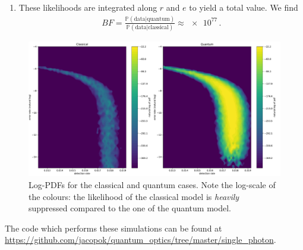 \documentclass[main.tex]{subfiles}
\begin{document}
\begin{enumerate}
    For each of the \(N _{\text{sim}}\) simulations the values \(N_{TG}\), \(N_{RG}\) and \(N_{TRG}\) are extracted (also, trivially, the fixed value of \(N_G\)). 
    From these, a gaussian Kernel-Density Estimation technique (using Scott's rule \cite[]{scipycontributorsScipyStatsGaussian2019,scottMultivariateDensityEstimation2015}) is used to estimate the value of the multivariate PDF at the point corresponding to the measured data for both models: the likelihood of the data.
    The variation of these likelihoods is shown in figure \ref{fig:both_logpdfs}. 
    \item These likelihoods are integrated along \(r\) and \(e\) to yield a total value. We find 
    \begin{align}
    BF = \frac{\mathbb{P}(\text{data} | \text{quantum})}{\mathbb{P}(\text{data} | \text{classical})}
    \approx \num{e77}
    \,.
    \end{align}
\end{enumerate}

\begin{figure}[ht]
\centering
\includegraphics[width=\textwidth]{figures/both_logpdfs}
\caption{Log-PDFs for the classical and quantum cases. Note the log-scale of the colours: the likelihood of the classical model is \emph{heavily} suppressed compared to the one of the quantum model.}
\label{fig:both_logpdfs}
\end{figure}

The code which performs these simulations can be found at \url{https://github.com/jacopok/quantum_optics/tree/master/single_photon}. 
\end{document}
